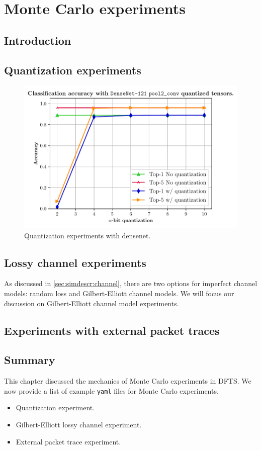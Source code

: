 \chapter{Monte Carlo experiments}\label{chapt:mc}

\section{Introduction}


\section{Quantization experiments}

\begin{figure}[H]
	\centering
	\includegraphics[scale=0.8]{Figures/quantdensenet121pool2conv.pdf}
	\caption{Quantization experiments with densenet.}
\end{figure}


\section{Lossy channel experiments}
As discussed in \ref{sec:simdescr:channel}, there are two options for imperfect channel models: random loss and Gilbert-Elliott channel models. We will focus our discussion on Gilbert-Elliott channel model experiments.



\section{Experiments with external packet traces}



\section{Summary}
This chapter discussed the mechanics of Monte Carlo experiments in DFTS. We now provide a list of example \verb|yaml| files for Monte Carlo experiments.

\begin{itemize}
	\item Quantization experiment.
	\item Gilbert-Elliott lossy channel experiment.
	\item External packet trace experiment.
\end{itemize}

